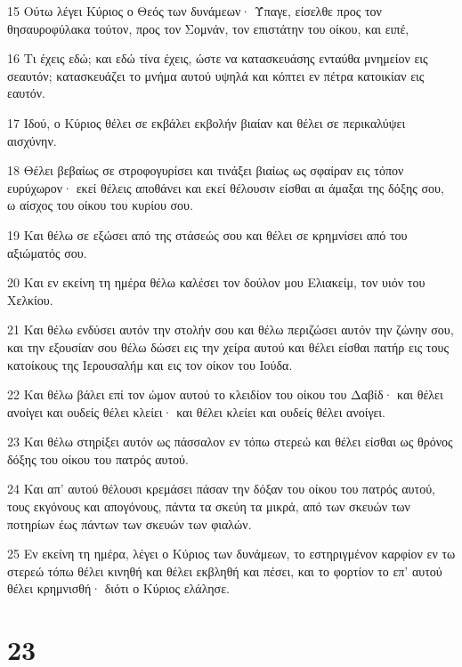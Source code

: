 \par 15 Ούτω λέγει Κύριος ο Θεός των δυνάμεων· Ύπαγε, είσελθε προς τον θησαυροφύλακα τούτον, προς τον Σομνάν, τον επιστάτην του οίκου, και ειπέ,
\par 16 Τι έχεις εδώ; και εδώ τίνα έχεις, ώστε να κατασκευάσης ενταύθα μνημείον εις σεαυτόν; κατασκευάζει το μνήμα αυτού υψηλά και κόπτει εν πέτρα κατοικίαν εις εαυτόν.
\par 17 Ιδού, ο Κύριος θέλει σε εκβάλει εκβολήν βιαίαν και θέλει σε περικαλύψει αισχύνην.
\par 18 Θέλει βεβαίως σε στροφογυρίσει και τινάξει βιαίως ως σφαίραν εις τόπον ευρύχωρον· εκεί θέλεις αποθάνει και εκεί θέλουσιν είσθαι αι άμαξαι της δόξης σου, ω αίσχος του οίκου του κυρίου σου.
\par 19 Και θέλω σε εξώσει από της στάσεώς σου και θέλει σε κρημνίσει από του αξιώματός σου.
\par 20 Και εν εκείνη τη ημέρα θέλω καλέσει τον δούλον μου Ελιακείμ, τον υιόν του Χελκίου.
\par 21 Και θέλω ενδύσει αυτόν την στολήν σου και θέλω περιζώσει αυτόν την ζώνην σου, και την εξουσίαν σου θέλω δώσει εις την χείρα αυτού και θέλει είσθαι πατήρ εις τους κατοίκους της Ιερουσαλήμ και εις τον οίκον του Ιούδα.
\par 22 Και θέλω βάλει επί τον ώμον αυτού το κλειδίον του οίκου του Δαβίδ· και θέλει ανοίγει και ουδείς θέλει κλείει· και θέλει κλείει και ουδείς θέλει ανοίγει.
\par 23 Και θέλω στηρίξει αυτόν ως πάσσαλον εν τόπω στερεώ και θέλει είσθαι ως θρόνος δόξης του οίκου του πατρός αυτού.
\par 24 Και απ' αυτού θέλουσι κρεμάσει πάσαν την δόξαν του οίκου του πατρός αυτού, τους εκγόνους και απογόνους, πάντα τα σκεύη τα μικρά, από των σκευών των ποτηρίων έως πάντων των σκευών των φιαλών.
\par 25 Εν εκείνη τη ημέρα, λέγει ο Κύριος των δυνάμεων, το εστηριγμένον καρφίον εν τω στερεώ τόπω θέλει κινηθή και θέλει εκβληθή και πέσει, και το φορτίον το επ' αυτού θέλει κρημνισθή· διότι ο Κύριος ελάλησε.

\chapter{23}

